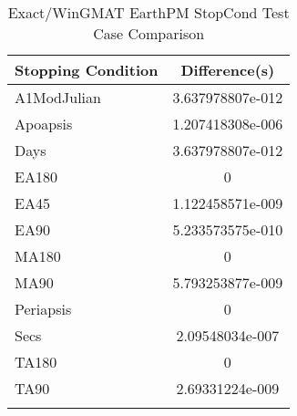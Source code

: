 \begin{table}[htbp!]
\centering
\caption{ Exact/WinGMAT EarthPM StopCond Test Case Comparison}
      \begin{tabular}{lc}
      \hline\hline
          Stopping Condition & Difference(s) \\
         \hline
         A1ModJulian & 3.637978807e-012 \\
         Apoapsis & 1.207418308e-006 \\
         Days & 3.637978807e-012 \\
         EA180 & 0 \\
         EA45 & 1.122458571e-009 \\
         EA90 & 5.233573575e-010 \\
         MA180 & 0 \\
         MA90 & 5.793253877e-009 \\
         Periapsis & 0 \\
         Secs & 2.09548034e-007 \\
         TA180 & 0 \\
         TA90 & 2.69331224e-009 \\
      \hline\hline
      \label{Table: Exact-WinGMAT EarthPM StopCond Table} 
\end{tabular}
\end{table}
